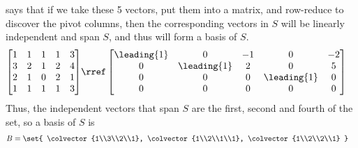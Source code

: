  says that if we take these 5 vectors, put them into a matrix, and row-reduce to discover the pivot columns, then the corresponding vectors in $S$ will be linearly independent and span $S$, and thus will form a basis of $S$.
%
\begin{align*}
\begin{bmatrix} 
1 & 1 & 1 & 1 & 3\\
3 & 2 & 1 & 2 & 4\\
2 & 1 & 0 & 2 & 1\\
1 & 1 & 1 & 1 & 3 
\end{bmatrix}
&\rref
\begin{bmatrix}
\leading{1} & 0 & -1 & 0 & -2\\
0 & \leading{1} & 2 & 0 & 5\\
0 & 0 & 0 & \leading{1} & 0\\
0 & 0 & 0 & 0 &0
\end{bmatrix}
\end{align*}
%
Thus, the independent vectors that span $S$ are the first, second and fourth of the set, so a basis of $S$ is 
%
\begin{align*}
B &= \set{
\colvector{1\\3\\2\\1},
\colvector{1\\2\\1\\1},
\colvector{1\\2\\2\\1}
}
\end{align*}
%


